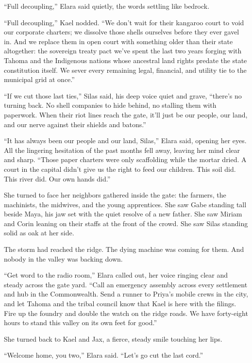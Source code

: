 ``Full decoupling,'' Elara said quietly, the words settling like bedrock.

``Full decoupling,'' Kael nodded. ``We don't wait for their kangaroo court to void our corporate charters; we dissolve those shells ourselves before they ever gavel in. And we replace them in open court with something older than their state altogether: the sovereign treaty pact we've spent the last two years forging with Tahoma and the Indigenous nations whose ancestral land rights predate the state constitution itself. We sever every remaining legal, financial, and utility tie to the municipal grid at once.''

``If we cut those last ties,'' Silas said, his deep voice quiet and grave, ``there's no turning back. No shell companies to hide behind, no stalling them with paperwork. When their riot lines reach the gate, it'll just be our people, our land, and our nerve against their shields and batons.''

``It has always been our people and our land, Silas,'' Elara said, opening her eyes. All the lingering hesitation of the past months fell away, leaving her mind clear and sharp. ``Those paper charters were only scaffolding while the mortar dried. A court in the capital didn't give us the right to feed our children. This soil did. This river did. Our own hands did.''

She turned to face her neighbors gathered inside the gate: the farmers, the machinists, the midwives, and the young apprentices. She saw Gabe standing tall beside Maya, his jaw set with the quiet resolve of a new father. She saw Miriam and Corin leaning on their staffs at the front of the crowd. She saw Silas standing solid as oak at her side.

The storm had reached the ridge. The dying machine was coming for them. And nobody in the valley was backing down.

``Get word to the radio room,'' Elara called out, her voice ringing clear and steady across the gate yard. ``Call an emergency assembly across every settlement and hub in the Commonwealth. Send a runner to Priya’s mobile crews in the city, and let Tahoma and the tribal council know that Kael is here with the filings. Fire up the foundry and double the watch on the ridge roads. We have forty-eight hours to stand this valley on its own feet for good.''

She turned back to Kael and Jax, a fierce, steady smile touching her lips.

``Welcome home, you two,'' Elara said. ``Let's go cut the last cord.''
